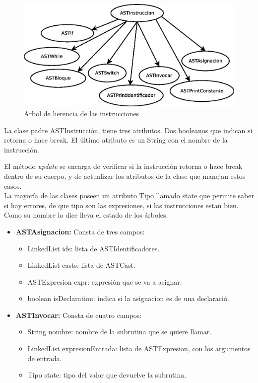 \documentclass[11pt, spanish]{report}
\begin{document}
\begin{itemize}
  \begin{figure}[htp]
    \centering
    \mbox{\includegraphics[scale=0.5]{instrucciones.jpg}}
    \caption{Arbol de herencia de las instrucciones}
    \label{fig instrucciones}
  \end{figure}
  
  La clase padre ASTInstrucci\'on, tiene tres atributos. Dos booleanos que indican si retorna o hace break. El \'ultimo atributo es un String con el nombre de la instrucci\'on. 
  
  El m\'etodo \emph{update} se encarga de verificar si la instrucci\'on retorna o hace break dentro de su cuerpo, y de actualizar los atributos de la clase que manejan estos casos.\\

  La mayor\'ia de las clases poseen un atributo Tipo llamado state que permite saber si hay errores, de que tipo son las expresiones, si las instrucciones estan bien. 
  Como su nombre lo dice lleva el estado de los \'arboles.\\
  
  \begin{itemize}
  \item \textbf{ASTAsignacion:}
    Consta de tres campos:
    \begin{itemize}      
    \item LinkedList ids: lista de ASTIdentificadores.
    \item LinkedList casts: lista de ASTCast.
    \item ASTExpresion expr: expresi\'on que se va a asignar.
    \item boolean isDeclaration: indica si la asignacion es de una declaraci\'o.
    \end{itemize}
  \item \textbf{ASTInvocar:}
    Consta de cuatro campos:
    \begin{itemize}      
    \item String nombre: nombre de la subrutina que se quiere llamar.
    \item LinkedList expresionEntrada: lista de ASTExpresion, con los argumentos de entrada.
    \item Tipo state: tipo del valor que devuelve la subrutina.
    \end{itemize}


\end{itemize}
\end{itemize}
\end{document}
